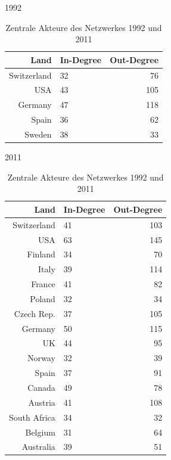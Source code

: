 \documentclass[a4paper,ngerman,oneside,titlepage,bibliography=totoc,11pt]{scrreprt}
\begin{document}
\begin{table}[h]
\centering
\footnotesize
\begin{minipage}[t]{0.48\textwidth}

\begin{center}
1992
\end{center}

\begin{tabular}{rlr}
  \hline
 Land 											& In-Degree & Out-Degree\\ 
  \hline
 Switzerland 								& 32				& 76\\ 
 USA 	& 43				& 105\\ 
 Germany & 47				& 118\\ 
 Spain 											& 36				& 62\\ 
 Sweden 										& 38 				& 33\\ 
   \hline

\end{tabular}
\end{minipage}
\hfill	
\begin{minipage}[t]{0.48\textwidth}

\begin{center}
2011
\end{center}

\begin{tabular}{rlr}
  \hline
 Land 						& In-Degree & Out-Degree\\ 
  \hline
 Switzerland 			& 41				& 103\\ 
 USA					 		& 63				& 145\\ 
 Finland 					& 34				& 70\\ 
 Italy 						& 39 				& 114\\ 
 France						& 41				& 82\\ 
 Poland						& 32				& 34\\
 Czech Rep.		& 37				& 105\\
 Germany					& 50				& 115\\
 UK		& 44				& 95\\
 Norway						& 32				& 39\\
 Spain  					& 37				& 91\\
 Canada						& 49				& 78\\
 Austria					& 41				& 108\\
 South Africa			& 34				& 32\\
 Belgium					& 31				& 64\\
 Australia				& 39				& 51\\
   \hline

\end{tabular}
\end{minipage}
\caption{Zentrale Akteure des Netzwerkes  1992 und 2011} 
\label{tab:ZentrAkt}
	\end{table}
\end{document}
